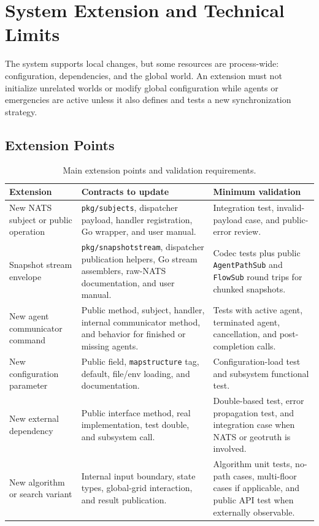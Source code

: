 \documentclass[12pt,a4paper]{report}
\begin{document}
\section{System Extension and Technical Limits}

The system supports local changes, but some resources are process-wide:
configuration, dependencies, and the global world. An extension must not
initialize unrelated worlds or modify global configuration while agents or
emergencies are active unless it also defines and tests a new synchronization
strategy.

\subsection{Extension Points}

\begin{table}[H]
\centering
\begin{tabular}{|p{}|p{}|p{}|}
\hline
\textbf{Extension} & \textbf{Contracts to update} & \textbf{Minimum validation} \\
\hline
New NATS subject or public operation &
\texttt{pkg/subjects}, dispatcher payload, handler registration, Go wrapper,
and user manual. &
Integration test, invalid-payload case, and public-error review. \\
\hline
Snapshot stream envelope &
\texttt{pkg/snapshotstream}, dispatcher publication helpers, Go stream
assemblers, raw-NATS documentation, and user manual. &
Codec tests plus public \texttt{AgentPathSub} and \texttt{FlowSub} round trips
for chunked snapshots. \\
\hline
New agent communicator command &
Public method, subject, handler, internal communicator method, and behavior for
finished or missing agents. &
Tests with active agent, terminated agent, cancellation, and post-completion
calls. \\
\hline
New configuration parameter &
Public field, \texttt{mapstructure} tag, default, file/env loading, and
documentation. &
Configuration-load test and subsystem functional test. \\
\hline
New external dependency &
Public interface method, real implementation, test double, and subsystem call. &
Double-based test, error propagation test, and integration case when NATS or
geotruth is involved. \\
\hline
New algorithm or search variant &
Internal input boundary, state types, global-grid interaction, and result
publication. &
Algorithm unit tests, no-path cases, multi-floor cases if applicable, and public
API test when externally observable. \\
\hline
\end{tabular}
\caption{Main extension points and validation requirements.}
\end{table}
\end{document}

